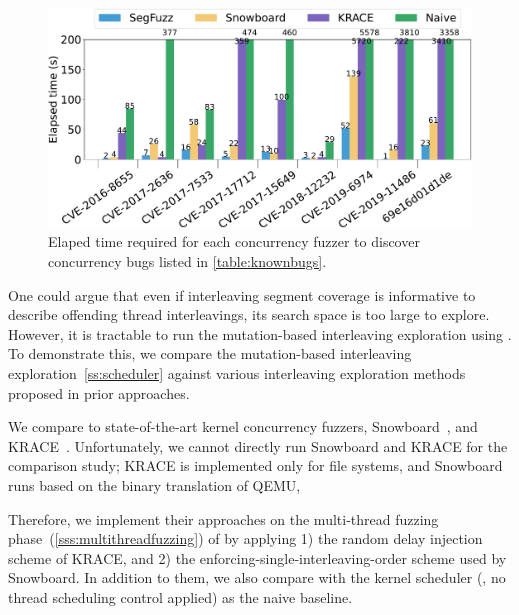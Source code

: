 \begin{figure}[t]
  \centering
  \includegraphics[width=0.99\linewidth]{fig/comparison_graph_time-crop.pdf}
  \caption{Elaped time required for each concurrency fuzzer to
    discover concurrency bugs listed in \autoref{table:knownbugs}.}
  \label{fig:eval:comparison-time}
  \vspace{-8pt}
\end{figure}


%
One could argue that even if interleaving segment coverage is
informative to describe offending thread interleavings, 
its search space is too large to explore.
%
However, it is tractable to run the mutation-based interleaving exploration
using \intcov.
To demonstrate this, we compare the mutation-based interleaving
exploration~\autoref{ss:scheduler} against various interleaving
exploration methods proposed in prior approaches.

%
We compare \sys to state-of-the-art kernel concurrency fuzzers,
Snowboard~\cite{snowboard}, and KRACE~\cite{krace}.
%
Unfortunately, we cannot directly run Snowboard and KRACE for the
comparison study; KRACE is implemented only for file systems, and
Snowboard runs based on the binary translation of QEMU, 

%
Therefore, we implement their approaches on the multi-thread fuzzing
phase~(\autoref{sss:multithreadfuzzing}) of \sys by applying 1) the
random delay injection scheme of KRACE, and 2) the
enforcing-single-interleaving-order scheme used by Snowboard.
%
In addition to them, we also compare with the kernel scheduler 
(\ie, no thread scheduling control applied) as the naive baseline.

